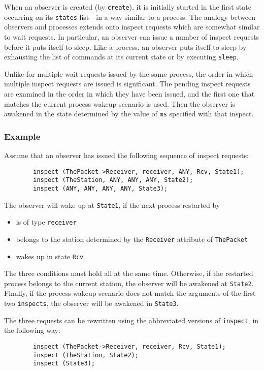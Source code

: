 When an observer is created (by {\tt create}), it is initially
started in the first state occurring on its {\tt states} list---in
a way similar to a process.
The analogy between observers and processes extends
onto inspect requests which are somewhat similar to wait requests.
In particular, an observer can issue a number of inspect requests before
it puts itself to sleep.
Like a process, an observer puts itself to sleep by exhausting
the list of commands at its current state or by executing {\tt sleep}.

Unlike for multiple wait requests issued by the same process,
the order in which multiple inspect requests are issued is
significant.
The pending inspect requests are examined in the order in which they have
been issued, and
the first one that matches the current process wakeup scenario is used.
Then the observer is awakened in the state determined by the
value of {\tt ms} specified with that inspect.

\subsubsection*{Example}

\noindent
Assume that an observer has issued the following
sequence of inspect requests:
\begin{verbatim}
        inspect (ThePacket->Receiver, receiver, ANY, Rcv, State1);
        inspect (TheStation, ANY, ANY, ANY, State2);
        inspect (ANY, ANY, ANY, ANY, State3);
\end{verbatim}

The observer will wake up at {\tt State1}, if the next process
restarted by \smurph
\begin{itemize}
\item
is of type {\tt receiver}
\item
belongs to the station determined
by the {\tt Receiver} attribute of {\tt ThePacket}
\item
wakes up in state {\tt Rcv}
\end{itemize}
The three conditions must hold all at the same time.
Otherwise, if the restarted process belongs to the
current station, the observer will be awakened at {\tt State2}.
Finally, if the process wakeup scenario does not match
the arguments of the first two {\tt inspects}, the observer will be
awakened in {\tt State3}.

The three requests can be rewritten using the abbreviated versions of
{\tt inspect}, in the following way:
\begin{verbatim}
        inspect (ThePacket->Receiver, receiver, Rcv, State1);
        inspect (TheStation, State2);
        inspect (State3);
\end{verbatim}

